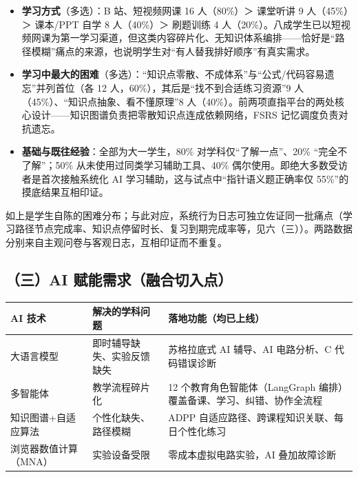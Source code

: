 \documentclass[zihao=-4,a4paper,UTF8,fontset=windows]{ctexart}
\begin{document}
\begin{itemize}[leftmargin=2em,itemsep=0pt,topsep=0pt]
\item \textbf{学习方式}（多选）：B 站、短视频网课 16 人（80\%）＞ 课堂听讲 9 人（45\%）＞ 课本/PPT 自学 8 人（40\%）＞ 刷题训练 4 人（20\%）。八成学生已以短视频网课为第一学习渠道，但这类内容碎片化、无知识体系编排——恰好是“路径模糊”痛点的来源，也说明学生对“有人替我排好顺序”有真实需求。
\item \textbf{学习中最大的困难}（多选）：“知识点零散、不成体系”与“公式/代码容易遗忘”并列首位（各 12 人，60\%），其后是“找不到合适练习资源”9 人（45\%）、“知识点抽象、看不懂原理”8 人（40\%）。前两项直指平台的两处核心设计——知识图谱负责把零散知识点连成依赖网络，FSRS 记忆调度负责对抗遗忘。
\item \textbf{基础与既往经验}：全部为大一学生，80\% 对学科仅“了解一点”、20\% “完全不了解”；50\% 从未使用过同类学习辅助工具、40\% 偶尔使用。即绝大多数受访者是首次接触系统化 AI 学习辅助，这与试点中“指针语义题正确率仅 55\%”的摸底结果互相印证。
\end{itemize}

如上是学生自陈的困难分布；与此对应，系统行为日志可独立佐证同一批痛点（学习路径节点完成率、知识点停留时长、复习到期完成率等，见六（三））。两路数据分别来自主观问卷与客观日志，互相印证而不重复。

\par\noindent\begin{minipage}{\linewidth}
\subsection{（三）AI 赋能需求（融合切入点）}
\par\noindent\begin{tabular}{|p{3.0cm}|p{4.5cm}|p{6.2cm}|}
\hline
\textbf{AI 技术} & \textbf{解决的学科问题} & \textbf{落地功能（均已上线）} \\ \hline
大语言模型 & 即时辅导缺失、实验反馈缺失 & 苏格拉底式 AI 辅导、AI 电路分析、C 代码错误诊断 \\ \hline
多智能体 & 教学流程碎片化 & 12 个教育角色智能体（LangGraph 编排）覆盖备课、学习、纠错、协作全流程 \\ \hline
知识图谱+自适应算法 & 个性化缺失、路径模糊 & ADPP 自适应路径、跨课程知识关联、每日个性化练习 \\ \hline
浏览器数值计算（MNA） & 实验设备受限 & 零成本虚拟电路实验，AI 叠加故障诊断 \\ \hline
\end{tabular}\par
\end{minipage}\par
\end{document}
